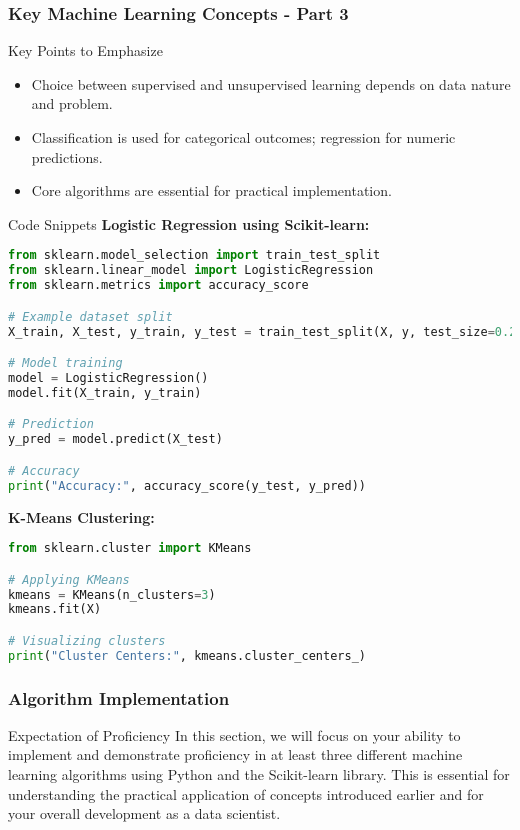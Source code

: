 \documentclass[aspectratio=169]{beamer}
\begin{document}
\begin{frame}[fragile]
    \frametitle{Key Machine Learning Concepts - Part 3}
    \begin{block}{Key Points to Emphasize}
        \begin{itemize}
            \item Choice between supervised and unsupervised learning depends on data nature and problem.
            \item Classification is used for categorical outcomes; regression for numeric predictions.
            \item Core algorithms are essential for practical implementation.
        \end{itemize}
    \end{block}

    \begin{block}{Code Snippets}
        \textbf{Logistic Regression using Scikit-learn:}
        \begin{lstlisting}[language=Python]
from sklearn.model_selection import train_test_split
from sklearn.linear_model import LogisticRegression
from sklearn.metrics import accuracy_score

# Example dataset split
X_train, X_test, y_train, y_test = train_test_split(X, y, test_size=0.2)

# Model training
model = LogisticRegression()
model.fit(X_train, y_train)

# Prediction
y_pred = model.predict(X_test)

# Accuracy
print("Accuracy:", accuracy_score(y_test, y_pred))
        \end{lstlisting}

        \textbf{K-Means Clustering:}
        \begin{lstlisting}[language=Python]
from sklearn.cluster import KMeans

# Applying KMeans
kmeans = KMeans(n_clusters=3)
kmeans.fit(X)

# Visualizing clusters
print("Cluster Centers:", kmeans.cluster_centers_)
        \end{lstlisting}
    \end{block}
\end{frame}

\begin{frame}[fragile]
    \frametitle{Algorithm Implementation}
    \begin{block}{Expectation of Proficiency}
        In this section, we will focus on your ability to implement and demonstrate proficiency in at least three different machine learning algorithms using Python and the Scikit-learn library. 
        This is essential for understanding the practical application of concepts introduced earlier and for your overall development as a data scientist.
    \end{block}
\end{frame}
\end{document}
